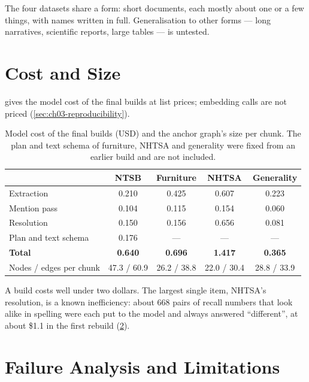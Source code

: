 The four datasets share a form: short documents, each mostly about one or a few things, with names written in
full. Generalisation to other forms --- long narratives, scientific reports, large tables --- is untested.

\section{Cost and Size}\label{sec:ch05-cost}

 gives the model cost of the final builds at list prices; embedding calls are not priced
(\cref{sec:ch03-reproducibility}).

\begin{table}[htbp]
\centering
\caption{Model cost of the final builds (USD) and the anchor graph's size per chunk. The plan and text schema of
furniture, NHTSA and generality were fixed from an earlier build and are not included.}
\label{tab:build-cost}
\small
\begin{tabular}{@{}lcccc@{}}
\toprule
& NTSB & Furniture & NHTSA & Generality \\
\midrule
Extraction & 0.210 & 0.425 & 0.607 & 0.223 \\
Mention pass & 0.104 & 0.115 & 0.154 & 0.060 \\
Resolution & 0.150 & 0.156 & 0.656 & 0.081 \\
Plan and text schema & 0.176 & --- & --- & --- \\
\textbf{Total} & \textbf{0.640} & \textbf{0.696} & \textbf{1.417} & \textbf{0.365} \\
\midrule
Nodes / edges per chunk & 47.3 / 60.9 & 26.2 / 38.8 & 22.0 / 30.4 & 28.8 / 33.9 \\
\bottomrule
\end{tabular}
\end{table}

A build costs well under two dollars. The largest single item, NHTSA's resolution, is a known inefficiency: about
668 pairs of recall numbers that look alike in spelling were each put to the model and always answered ``different'',
at about \$1.1 in the first rebuild (\cref{sec:ch05-limitations}).

\section{Failure Analysis and Limitations}\label{sec:ch05-limitations}

